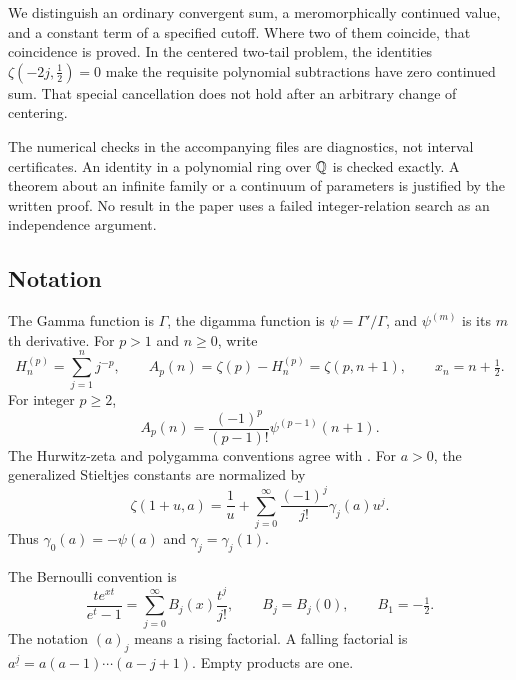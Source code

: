 We distinguish an ordinary convergent sum, a meromorphically continued
value, and a constant term of a specified cutoff. Where two of them
coincide, that coincidence is proved. In the centered two-tail problem,
the identities $\zeta(-2j,\tfrac12)=0$ make the requisite polynomial
subtractions have zero continued sum. That special cancellation does
not hold after an arbitrary change of centering.

The numerical checks in the accompanying files are diagnostics, not
interval certificates. An identity in a polynomial ring over $\mathbb Q$ is
checked exactly. A theorem about an infinite family or a continuum of
parameters is justified by the written proof. No result in the paper
uses a failed integer-relation search as an independence argument.

\subsection{Notation}

The Gamma function is $\Gamma$, the digamma function is
$\psi=\Gamma'/\Gamma$, and $\psi^{(m)}$ is its $m$th derivative.
For $p>1$ and $n\geq0$, write
\begin{equation}\label{eq:tails}
 H_n^{(p)}=\sum_{j=1}^n j^{-p},\qquad
 A_p(n)=\zeta(p)-H_n^{(p)}=\zeta(p,n+1),\qquad
 x_n=n+\tfrac12.
\end{equation}
For integer $p\geq2$,
\begin{equation}\label{eq:tail-polygamma}
 A_p(n)=\frac{(-1)^p}{(p-1)!}\psi^{(p-1)}(n+1).
\end{equation}
The Hurwitz-zeta and polygamma conventions agree with
\cite{dlmf-hurwitz,dlmf-polygamma}.
For $a>0$, the generalized Stieltjes constants are normalized by
\begin{equation}\label{eq:stieltjes-convention}
 \zeta(1+u,a)=\frac1u+
   \sum_{j=0}^{\infty}\frac{(-1)^j}{j!}\gamma_j(a)u^j.
\end{equation}
Thus $\gamma_0(a)=-\psi(a)$ and $\gamma_j=\gamma_j(1)$.

The Bernoulli convention is
\begin{equation}\label{eq:bernoulli-convention}
 \frac{te^{xt}}{e^t-1}=\sum_{j=0}^{\infty}B_j(x)\frac{t^j}{j!},
 \qquad B_j=B_j(0),\qquad B_1=-\tfrac12.
\end{equation}
The notation $(a)_j$ means a rising factorial. A falling factorial is
$a^{\underline j}=a(a-1)\cdots(a-j+1)$. Empty products are one.

